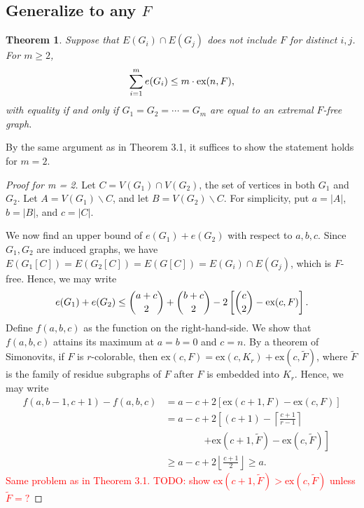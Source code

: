 \documentclass[a4paper]{article}
\newtheorem{theorem}{Theorem}[section]
\begin{document}
\subsection{Generalize to any $F$}

\begin{theorem}
  Suppose that $E(G_i) \cap E(G_j)$ does not include $F$ for distinct $i, j$. For $m \geq 2$,
  \[
    \sum_{i = 1}^m e(G_i) \leq m \cdot \textnormal{ex}(n, F),
  \]
  with equality if and only if $G_1 = G_2 = \cdots = G_m$ are equal to an extremal $F$-free graph.
\end{theorem}

By the same argument as in Theorem 3.1, it suffices to show the statement holds for $m = 2$. 

\begin{proof}[Proof for m = 2]
  Let $C = V(G_1) \cap V(G_2)$, the set of vertices in both $G_1$ and $G_2$. Let $A = V(G_1)
  \backslash C$, and let $B = V(G_2) \backslash C$. For simplicity, put $a = |A|$, $b = |B|$, and $c
  = |C|$. 

  We now find an upper bound of $e(G_1) + e(G_2)$ with respect to $a, b, c$. Since $G_1, G_2$ are
  induced graphs, we have $E(G_1[C]) = E(G_2[C]) = E(G[C]) = E(G_i) \cap E(G_j)$, which is $F$-free.
  Hence, we may write
  \[
    e(G_1) + e(G_2) \leq \binom{a + c}{2} +  \binom{b + c}{2} - 2\left[\binom{c}{2} - \textnormal{ex}(c, F)\right].
  \]
  Define $f(a, b, c)$ as the function on the right-hand-side. We show that $f(a, b, c)$ attains its
  maximum at $a = b = 0$ and $c = n$. By a theorem of Simonovits, if $F$ is $r$-colorable, then
  $\text{ex}(c, F) = \text{ex}(c, K_r) + \text{ex}(c, \tilde{F})$, where $\tilde{F}$ is the family
  of residue subgraphs of $F$ after $F$ is embedded into $K_r$. Hence, we may write
  \begin{align*}
    f(a, b - 1, c + 1) - f(a, b, c)
    &= a - c + 2[\text{ex}(c + 1, F) - \text{ex}(c, F)] \\
    &= a - c + 2\left[(c + 1) - \left\lceil \frac{c + 1}{r - 1} \right\rceil \right. \\
    &\qquad\qquad \left. + \text{ex}(c + 1, \tilde{F}) - \text{ex}(c, \tilde{F})\right] \\
    &\geq a - c + 2\left\lfloor \frac{c + 1}{2} \right\rfloor \geq a.
  \end{align*}
  \textcolor{red}{Same problem as in Theorem 3.1. TODO: show $\text{ex}(c + 1, \tilde{F}) >
  \text{ex}(c, \tilde{F})$ unless $\tilde{F} = ?$}
\end{proof}
\end{document}
